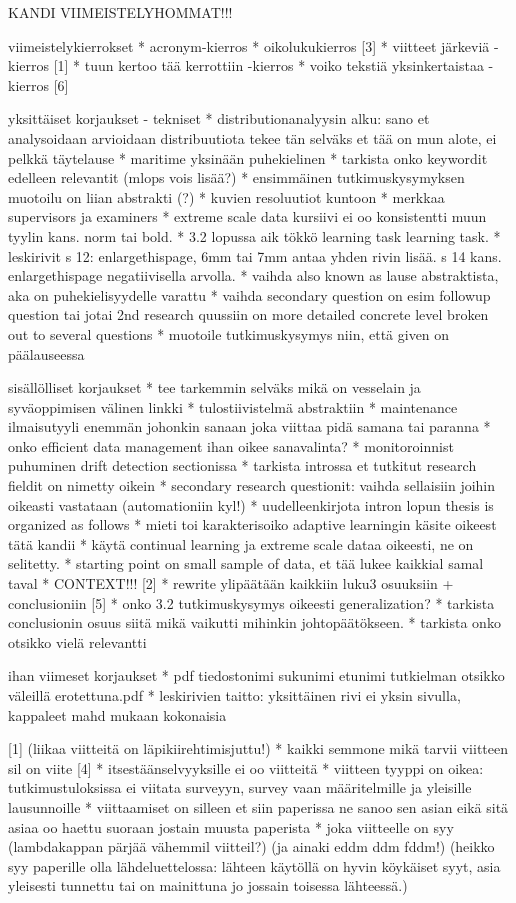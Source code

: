 KANDI VIIMEISTELYHOMMAT!!!

viimeistelykierrokset
* acronym-kierros
* oikolukukierros [3]
* viitteet järkeviä -kierros [1]
* tuun kertoo tää kerrottiin -kierros
* voiko tekstiä yksinkertaistaa -kierros [6]

yksittäiset korjaukset - tekniset
* distributionanalyysin alku: sano et analysoidaan arvioidaan distribuutiota tekee tän selväks et tää on mun alote, ei pelkkä täytelause
* maritime yksinään puhekielinen
* tarkista onko keywordit edelleen relevantit (mlops vois lisää?)
* ensimmäinen tutkimuskysymyksen muotoilu on liian abstrakti (?)
* kuvien resoluutiot kuntoon
* merkkaa supervisors ja examiners
* extreme scale data kursiivi ei oo konsistentti muun tyylin kans. norm tai bold.
* 3.2 lopussa aik tökkö learning task learning task.
* leskirivit s 12: enlargethispage, 6mm tai 7mm antaa yhden rivin lisää. s 14 kans. enlargethispage negatiivisella arvolla.
* vaihda also known as lause abstraktista, aka on puhekielisyydelle varattu
* vaihda secondary question on esim followup question tai jotai 2nd research quussiin on more detailed concrete level broken out to several questions
* muotoile tutkimuskysymys niin, että given on päälauseessa

sisällölliset korjaukset
* tee tarkemmin selväks mikä on vesselain ja syväoppimisen välinen linkki
* tulostiivistelmä abstraktiin
* maintenance ilmaisutyyli enemmän johonkin sanaan joka viittaa pidä samana tai paranna
* onko efficient data management ihan oikee sanavalinta?
* monitoroinnist puhuminen drift detection sectionissa
* tarkista introssa et tutkitut research fieldit on nimetty oikein
* secondary research questionit: vaihda sellaisiin joihin oikeasti vastataan (automationiin kyl!)
* uudelleenkirjota intron lopun thesis is organized as follows
* mieti toi karakterisoiko adaptive learningin käsite oikeest tätä kandii
* käytä continual learning ja extreme scale dataa oikeesti, ne on selitetty.
* starting point on small sample of data, et tää lukee kaikkial samal taval
* CONTEXT!!! [2]
* rewrite ylipäätään kaikkiin luku3 osuuksiin + conclusioniin [5]
* onko 3.2 tutkimuskysymys oikeesti generalization?
* tarkista conclusionin osuus siitä mikä vaikutti mihinkin johtopäätökseen.
* tarkista onko otsikko vielä relevantti

ihan viimeset korjaukset
* pdf tiedostonimi sukunimi etunimi tutkielman otsikko väleillä erotettuna.pdf
* leskirivien taitto: yksittäinen rivi ei yksin sivulla, kappaleet mahd mukaan kokonaisia

[1] (liikaa viitteitä on läpikiirehtimisjuttu!)
* kaikki semmone mikä tarvii viitteen sil on viite [4]
* itsestäänselvyyksille ei oo viitteitä
* viitteen tyyppi on oikea: tutkimustuloksissa ei viitata surveyyn, survey vaan määritelmille ja yleisille lausunnoille
* viittaamiset on silleen et siin paperissa ne sanoo sen asian eikä sitä asiaa oo haettu suoraan jostain muusta paperista
* joka viitteelle on syy (lambdakappan pärjää vähemmil viitteil?) (ja ainaki eddm ddm fddm!)
(heikko syy paperille olla lähdeluettelossa: lähteen käytöllä on hyvin köykäiset syyt, asia yleisesti tunnettu tai on mainittuna jo jossain toisessa lähteessä.)

